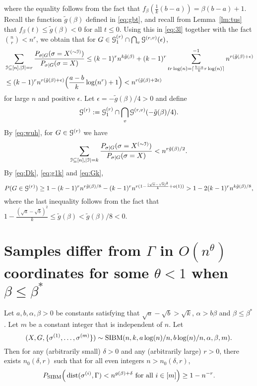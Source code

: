 \documentclass{article}
\begin{document}
where the equality follows from the fact that $f_{\beta}(\frac{1}{k}(b-a))=\beta(b-a)+1$.
Recall the function $\tilde{g}(\beta)$ defined in \eqref{eq:gbt}, and recall from  Lemma~\ref{lm:tus} that
$f_{\beta}(t)\le \tilde{g}(\beta)<0$ for all $t\le 0$.
Using this in \eqref{eq:3l} together with the fact $\binom{n}{r}<n^r$, we obtain that for
$G\in\mathcal{G}_1^{(r)}\cap \bigcap_{v} \mathcal{G}^{(r,v)}(\epsilon)$,
\begin{equation} \label{eq:wuh}
\begin{aligned}
& \sum_{\mathcal{I}\subseteq[n],|\mathcal{I}|=r}
\frac{P_{\sigma|G}(\sigma=X^{(\sim \mathcal{I})} )}
{P_{\sigma|G}(\sigma=X)} 
\le (k-1)^rn^{k\tilde{g}(\beta)}
+ (k-1)^r\sum_{tr\log(n)=\lceil\frac{b-a}{k}r\log(n) \rceil}^{-1}  n^{r(\tilde{g}(\beta) + \epsilon)}  \\
& \le(k-1)^r n^{r(\tilde{g}(\beta) + \epsilon)}
\Big(\frac{a-b}{k}\log(n^r)+1 \Big)
< n^{r(\tilde{g}(\beta) + 2\epsilon)} 
\end{aligned}
\end{equation}
for large $n$ and positive $\epsilon$.
Let $\epsilon=-\tilde{g}(\beta)/4>0$ and define
$$
\mathcal{G}^{(r)}:=\mathcal{G}_1^{(r)}\cap \bigcap_{v} \mathcal{G}^{(r,v)}(-\tilde{g}(\beta)/4) .
$$
By \eqref{eq:wuh}, for $G\in\mathcal{G}^{(r)}$ we have
$$
\sum_{\mathcal{I}\subseteq[n],|\mathcal{I}|=k}
\frac{P_{\sigma|G}(\sigma=X^{(\sim \mathcal{I})} )}
{P_{\sigma|G}(\sigma=X)} <
n^{r \tilde{g}(\beta) /2} .
$$
By \eqref{eq:Dk}, \eqref{eq:g1k} and \eqref{eq:Gk}, 
$$
P(G\in\mathcal{G}^{(r)})\ge 1-(k-1)^rn^{r\tilde{g}(\beta)/8}- (k-1)^rn^{r (1-\frac{(\sqrt{a}-\sqrt{b})^2}{k} + o(1) )}> 1- 2(k-1)^r n^{k\tilde{g}(\beta)/8},
$$
where the last inequality follows from the fact that $1-\frac{(\sqrt{a}-\sqrt{b})^2}{k}\le
\tilde{g}(\beta)<\tilde{g}(\beta)/8< 0$.

\section{Samples differ from $\Gamma$ in $O(n^{\theta})$ coordinates for some $\theta<1$ when $\beta\le\beta^\ast$}
\label{sect:theta}



\begin{proposition} \label{prop:43}
Let $a,b,\alpha,\beta> 0$ be constants satisfying that $\sqrt{a}-\sqrt{b} > \sqrt{k}$, $\alpha>b\beta$ and $\beta\le\beta^\ast$. Let $m$ be a constant integer that is independent of $n$.
Let 
$$
(X,G,\{\sigma^{(1)},\dots,\sigma^{(m)}\})\sim \operatorname{SIBM}(n,k, a\log(n)/n, b\log(n)/n,\alpha,\beta, m) .
$$
Then for any (arbitrarily small) $\delta>0$ and any (arbitrarily large) $r>0$, there exists $n_0(\delta, r)$ such that for all even integers $n>n_0(\delta, r)$,
$$
P_{\operatorname{SIBM}} \Big(\operatorname{dist}(\sigma^{(i)},\Gamma)<n^{g(\beta)+\delta}
\text{~for all~} i\in[m] \Big) \ge 1- n^{-r} .
$$
\end{proposition}
\end{document}

